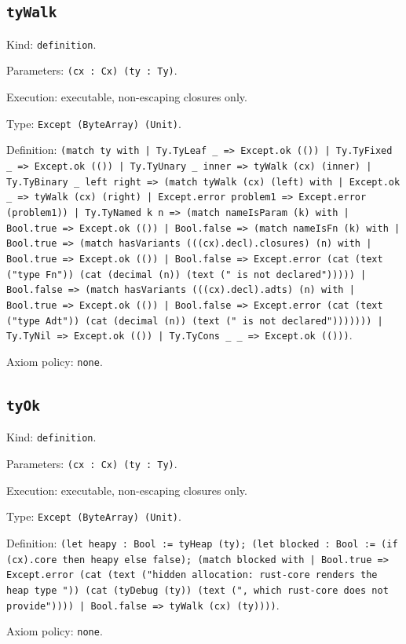 \documentclass[11pt]{article}
\begin{document}
\subsection*{\texttt{tyWalk}}
\noindent Kind: \texttt{definition}.\par
\noindent Parameters: \texttt{(cx : Cx) (ty : Ty)}.\par
\noindent Execution: executable, non-escaping closures only.\par
\noindent Type: \texttt{Except (ByteArray) (Unit)}.\par
\noindent Definition: \texttt{(match ty with | Ty.TyLeaf \_ => Except.ok (()) | Ty.TyFixed \_ => Except.ok (()) | Ty.TyUnary \_ inner => tyWalk (cx) (inner) | Ty.TyBinary \_ left right => (match tyWalk (cx) (left) with | Except.ok \_ => tyWalk (cx) (right) | Except.error problem1 => Except.error (problem1)) | Ty.TyNamed k n => (match nameIsParam (k) with | Bool.true => Except.ok (()) | Bool.false => (match nameIsFn (k) with | Bool.true => (match hasVariants (((cx).decl).closures) (n) with | Bool.true => Except.ok (()) | Bool.false => Except.error (cat (text ("type Fn")) (cat (decimal (n)) (text (" is not declared"))))) | Bool.false => (match hasVariants (((cx).decl).adts) (n) with | Bool.true => Except.ok (()) | Bool.false => Except.error (cat (text ("type Adt")) (cat (decimal (n)) (text (" is not declared"))))))) | Ty.TyNil => Except.ok (()) | Ty.TyCons \_ \_ => Except.ok (()))}.\par
\noindent Axiom policy: \texttt{none}.\par
\subsection*{\texttt{tyOk}}
\noindent Kind: \texttt{definition}.\par
\noindent Parameters: \texttt{(cx : Cx) (ty : Ty)}.\par
\noindent Execution: executable, non-escaping closures only.\par
\noindent Type: \texttt{Except (ByteArray) (Unit)}.\par
\noindent Definition: \texttt{(let heapy : Bool := tyHeap (ty); (let blocked : Bool := (if (cx).core then heapy else false); (match blocked with | Bool.true => Except.error (cat (text ("hidden allocation: rust-core renders the heap type ")) (cat (tyDebug (ty)) (text (", which rust-core does not provide")))) | Bool.false => tyWalk (cx) (ty))))}.\par
\noindent Axiom policy: \texttt{none}.\par
\end{document}
